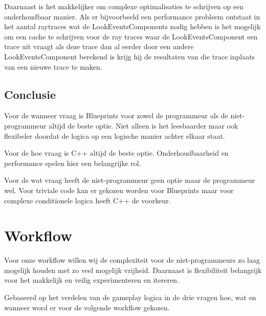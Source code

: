 Daarnaast is het makkelijker om complexe optimalisaties te schrijven op een onderhoudbaar manier. Als er bijvoorbeeld een performance probleem ontstaat in het aantal raytraces wat de LookEventsComponents nodig hebben is het mogelijk om een cache te schrijven voor de ray traces waar de LookEventsComponent een trace uit vraagt als deze trace dan al eerder door een andere LookEventsComponent berekend is krijg hij de resultaten van die trace inplaats van een nieuwe trace te maken.

\subsection{Conclusie}
Voor de wanneer vraag is Blueprints voor zowel de programmeur als de niet-programmeur altijd de beste optie. Niet alleen is het leesbaarder maar ook flexibeler doordat de logica op een logische manier achter elkaar staat.

Voor de hoe vraag is C++ altijd de beste optie. Onderhoudbaarheid en performance spelen hier een belangrijke rol. 

Voor de wat vraag heeft de niet-programmeur geen optie maar de programmeur wel. Voor triviale code kan er gekozen worden voor Blueprints maar voor complexe conditionele logica heeft C++ de voorkeur. 

\section{Workflow}
Voor onze workflow willen wij de complexiteit voor de niet-programmeurs zo laag mogelijk houden met zo veel mogelijk vrijheid. Daarnaast is flexibiliteit belangrijk voor het makkelijk en veilig experimenteren en itereren.

Gebaseerd op het verdelen van de gameplay logica in de drie vragen hoe, wat en wanneer word er voor de volgende workflow gekozen.
    
\begin{center}
\end{center}

